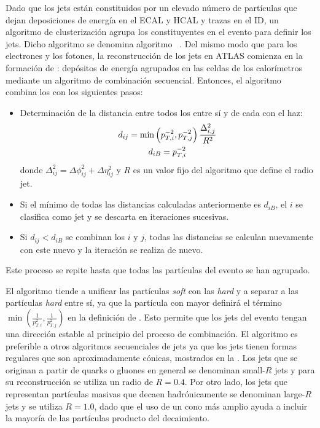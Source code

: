 Dado que los jets están constituidos por un elevado número de partículas que dejan deposiciones de energía en el \ac{ECAL} y \ac{HCAL} y trazas en el \ac{ID}, un algoritmo de clusterización agrupa los constituyentes en el evento para definir los jets. Dicho algoritmo se denomina algoritmo \antikt~\cite{AntiKtAlgorithm}. Del mismo modo que para los electrones y los fotones, la reconstrucción de los jets en \ac{ATLAS} comienza en la formación de \topos: depósitos de energía agrupados en las celdas de los calorímetros mediante un algoritmo de combinación secuencial. Entonces, el algoritmo \antikt combina los \topos con los siguientes pasos:
\begin{itemize}
    \item Determinación de la distancia entre todos los \topos entre sí y de cada \topo con el haz:
        \begin{gather}
            d_{ij} = \min \left( p_{T,i}^{-2}, p_{T,j}^{-2} \right) \frac{\Delta_{i,j}^2}{R^2}\\
            d_{iB} = p_{T,i}^{-2}
        \end{gather}
        donde \(\Delta_{ij}^2 = \Delta\phi_{ij}^2 + \Delta\eta_{ij}^2\) y \(R\) es un valor fijo del algoritmo que define el radio jet.
    \item Si el mínimo de todas las distancias calculadas anteriormente es \(d_{iB}\), el \topo \(i\) se clasifica como jet y se descarta en iteraciones sucesivas.
    \item Si \(d_{ij} < d_{iB}\) se combinan los \topos \(i\) y \(j\), todas las distancias se calculan nuevamente con este nuevo \topo y la iteración se realiza de nuevo.
\end{itemize}
Este proceso se repite hasta que todas las partículas del evento se han agrupado.

El algoritmo \antikt tiende a unificar las partículas \textit{soft} con las \textit{hard} y a separar a las partículas \textit{hard} entre sí, ya que la partícula con mayor \pt definirá el término \(\min \left( \frac{1}{p_{T,i}^2}, \frac{1}{p_{T,j}^2}  \right)\) en la definición de \dij. Esto permite que los jets del evento tengan una dirección estable al principio del proceso de combinación. El algoritmo \antikt es preferible a otros algoritmos secuenciales de jets ya que los jets tienen formas regulares que son aproximadamente cónicas, mostrados en la \Fig{\ref{fig:objects:jets:antikt}}. Los jets que se originan a partir de quarks o gluones en general se denominan small-\(R\) jets y para su reconstrucción se utiliza un radio de \(R=0.4\). Por otro lado, los jets que representan partículas masivas que decaen hadrónicamente se denominan large-\(R\) jets y se utiliza \(R=1.0\), dado que el uso de un cono más amplio ayuda a incluir la mayoría de las partículas producto del decaimiento.



